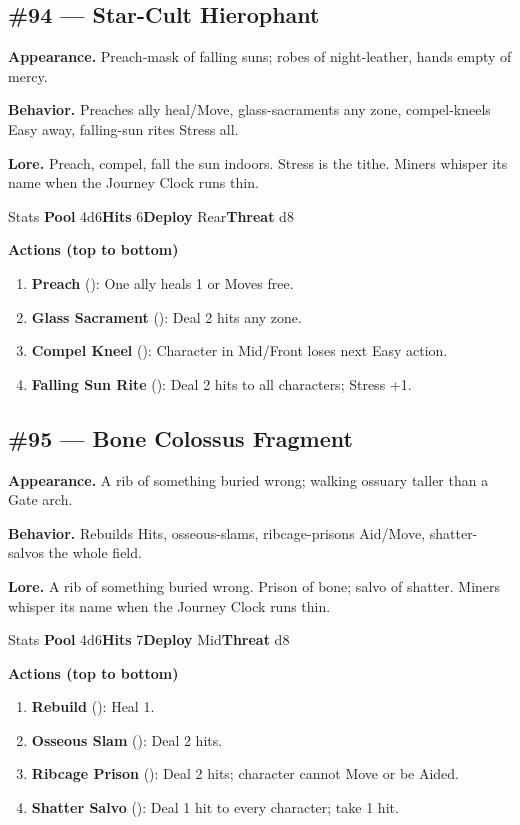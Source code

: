 \subsection*{\#94 --- Star-Cult Hierophant}

\textbf{Appearance.} Preach-mask of falling suns; robes of night-leather, hands empty of mercy.

\textbf{Behavior.} Preaches ally heal/Move, glass-sacraments any zone, compel-kneels Easy away, falling-sun rites Stress all.

\textbf{Lore.} Preach, compel, fall the sun indoors. Stress is the tithe. Miners whisper its name when the Journey Clock runs thin.

\begin{monsterentry}{Stats}
\textbf{Pool} 4d6\quad\textbf{Hits} 6\quad\textbf{Deploy} Rear\quad\textbf{Threat} d8

\textbf{Actions (top to bottom)}
\begin{enumerate}\setlength{\itemsep}{0.15em}\setlength{\parskip}{0pt}
  \item \textbf{Preach} (\easy): One ally heals 1 or Moves free.
  \item \textbf{Glass Sacrament} (\medium): Deal 2 hits any zone.
  \item \textbf{Compel Kneel} (\hard): Character in Mid/Front loses next Easy action.
  \item \textbf{Falling Sun Rite} (\hard): Deal 2 hits to all characters; Stress +1.
\end{enumerate}
\end{monsterentry}

\subsection*{\#95 --- Bone Colossus Fragment}

\textbf{Appearance.} A rib of something buried wrong; walking ossuary taller than a Gate arch.

\textbf{Behavior.} Rebuilds Hits, osseous-slams, ribcage-prisons Aid/Move, shatter-salvos the whole field.

\textbf{Lore.} A rib of something buried wrong. Prison of bone; salvo of shatter. Miners whisper its name when the Journey Clock runs thin.

\begin{monsterentry}{Stats}
\textbf{Pool} 4d6\quad\textbf{Hits} 7\quad\textbf{Deploy} Mid\quad\textbf{Threat} d8

\textbf{Actions (top to bottom)}
\begin{enumerate}\setlength{\itemsep}{0.15em}\setlength{\parskip}{0pt}
  \item \textbf{Rebuild} (\easy): Heal 1.
  \item \textbf{Osseous Slam} (\medium): Deal 2 hits.
  \item \textbf{Ribcage Prison} (\hard): Deal 2 hits; character cannot Move or be Aided.
  \item \textbf{Shatter Salvo} (\hard): Deal 1 hit to every character; take 1 hit.
\end{enumerate}
\end{monsterentry}

